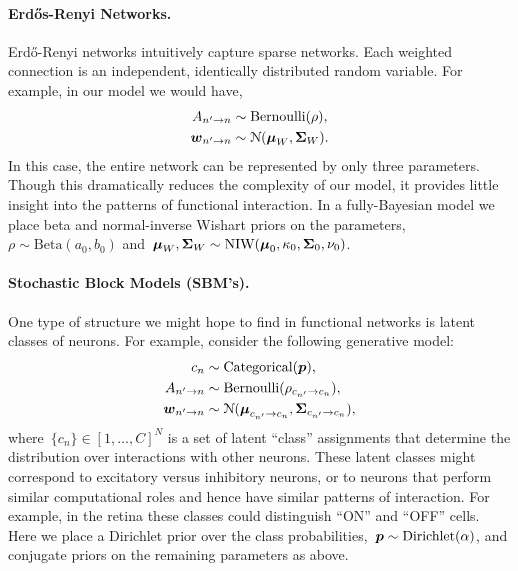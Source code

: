 \documentclass[aos]{imsart} %
\begin{document}
\paragraph{Erd\H{o}s-Renyi Networks.}
Erd\H{o}-Renyi networks intuitively capture sparse networks. Each weighted connection is an independent, identically distributed random variable. For example, in our model we would have,
\begin{align}
\label{eq:er_A} A_{n' \to n} &\sim \text{Bernoulli}(\rho), \\
\label{eq:er_W} \bw_{n' \to n} &\sim \distNormal(\bmu_W, \bSigma_W).
\end{align}
In this case, the entire network can be represented by only three parameters. Though this dramatically reduces the complexity of our model, it provides little insight into the patterns of functional interaction. In a fully-Bayesian model we place beta and normal-inverse Wishart priors on the parameters,~${\rho \sim \text{Beta}(a_0, b_0)}$ and~${\boldsymbol{\mu}_W,\boldsymbol{\Sigma}_W \sim \text{NIW}(\boldsymbol{\mu}_0, \kappa_0, \boldsymbol{\Sigma}_0, \nu_0)}$. 

\paragraph{Stochastic Block Models (SBM's).} One type of structure we might hope to find in functional networks is latent classes of neurons. For example, consider the following generative model:
\begin{align}
c_n &\sim \text{Categorical}(\bp),\\
A_{n' \to n} &\sim \text{Bernoulli}(\rho_{c_{n'}\to c_n}), \\
\bw_{n' \to n} &\sim \distNormal(\bmu_{c_{n'}\to c_n}, \bSigma_{c_{n'}\to c_n}),
\end{align}
where~${\{c_n\} \in [1,\ldots, C]^N}$ is a set of latent ``class'' assignments that determine the distribution over interactions with other neurons. These latent classes might correspond to excitatory versus inhibitory neurons, or to neurons that perform similar computational roles and hence have similar patterns of interaction. For example, in the retina these classes could distinguish ``ON'' and ``OFF'' cells. Here we place a Dirichlet prior over the class probabilities,~$\boldsymbol{p} \sim \text{Dirichlet}(\alpha)$, and conjugate priors on the remaining parameters as above.
\end{document}
